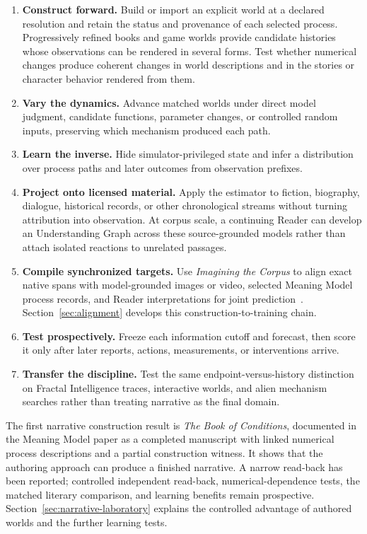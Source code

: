 \documentclass[10pt]{article}
\newcommand{\Book}{\textit{The Book of Conditions}}
\begin{document}
\begin{enumerate}
  \item \textbf{Construct forward.} Build or import an explicit world at a
    declared resolution and retain the status and provenance of each selected
    process. Progressively refined books and game worlds provide candidate
    histories whose observations can be rendered in several forms. Test whether
    numerical changes produce coherent changes in world descriptions and in
    the stories or character behavior rendered from them.
  \item \textbf{Vary the dynamics.} Advance matched worlds under direct model
    judgment, candidate functions, parameter changes, or controlled random
    inputs, preserving which mechanism produced each path.
  \item \textbf{Learn the inverse.} Hide simulator-privileged state and infer a
    distribution over process paths and later outcomes from observation
    prefixes.
  \item \textbf{Project onto licensed material.} Apply the estimator to fiction,
    biography, dialogue, historical records, or other chronological streams
    without turning attribution into observation. At corpus scale, a continuing
    Reader can develop an Understanding Graph across these source-grounded
    models rather than attach isolated reactions to unrelated passages.
  \item \textbf{Compile synchronized targets.} Use \emph{Imagining the Corpus}
    to align exact native spans with model-grounded images or video, selected
    Meaning Model process records, and Reader interpretations for joint
    prediction~\cite{westerbergImagining2026}. Section~\ref{sec:alignment}
    develops this construction-to-training chain.
  \item \textbf{Test prospectively.} Freeze each information cutoff and forecast,
    then score it only after later reports, actions, measurements, or
    interventions arrive.
  \item \textbf{Transfer the discipline.} Test the same endpoint-versus-history
    distinction on Fractal Intelligence traces, interactive worlds, and alien
    mechanism searches rather than treating narrative as the final domain.
\end{enumerate}

The first narrative construction result is \Book{}, documented in the
Meaning Model paper as a completed manuscript with linked numerical process
descriptions and a partial construction witness. It shows that the authoring
approach can produce a finished narrative. A narrow read-back has been
reported; controlled independent read-back, numerical-dependence tests, the matched literary comparison, and learning
benefits remain prospective. Section~\ref{sec:narrative-laboratory} explains the
controlled advantage of authored worlds and the further learning tests.
\end{document}
